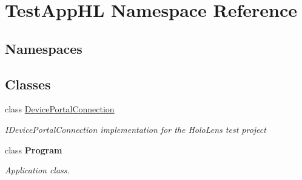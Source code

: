 \hypertarget{namespace_test_app_h_l}{}\section{Test\+App\+HL Namespace Reference}
\label{namespace_test_app_h_l}
\subsection*{Namespaces}
\begin{DoxyCompactItemize}
\end{DoxyCompactItemize}
\subsection*{Classes}
\begin{DoxyCompactItemize}
\item 
class \hyperlink{class_test_app_h_l_1_1_device_portal_connection}{Device\+Portal\+Connection}
\begin{DoxyCompactList}\small\item\em I\+Device\+Portal\+Connection implementation for the Holo\+Lens test project \end{DoxyCompactList}\item 
class {\bfseries Program}
\begin{DoxyCompactList}\small\item\em Application class. \end{DoxyCompactList}\end{DoxyCompactItemize}
